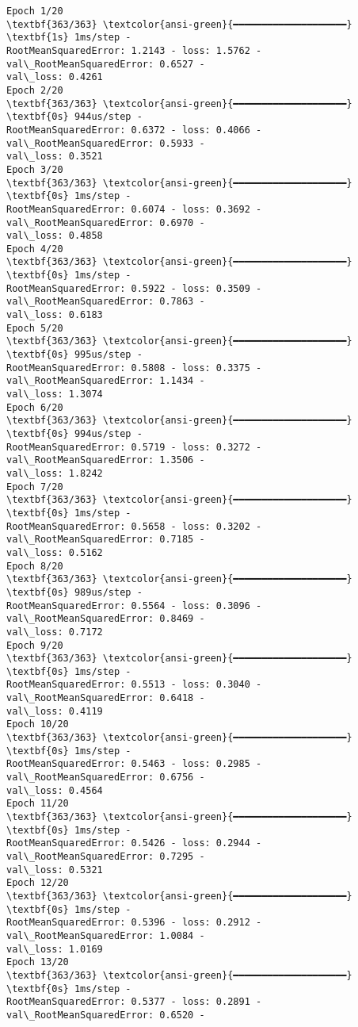 \documentclass[12pt letter]{report}
\begin{document}
    \begin{Verbatim}[commandchars=\\\{\}]
Epoch 1/20
\textbf{363/363} \textcolor{ansi-green}{━━━━━━━━━━━━━━━━━━━━} \textbf{1s} 1ms/step -
RootMeanSquaredError: 1.2143 - loss: 1.5762 - val\_RootMeanSquaredError: 0.6527 -
val\_loss: 0.4261
Epoch 2/20
\textbf{363/363} \textcolor{ansi-green}{━━━━━━━━━━━━━━━━━━━━} \textbf{0s} 944us/step -
RootMeanSquaredError: 0.6372 - loss: 0.4066 - val\_RootMeanSquaredError: 0.5933 -
val\_loss: 0.3521
Epoch 3/20
\textbf{363/363} \textcolor{ansi-green}{━━━━━━━━━━━━━━━━━━━━} \textbf{0s} 1ms/step -
RootMeanSquaredError: 0.6074 - loss: 0.3692 - val\_RootMeanSquaredError: 0.6970 -
val\_loss: 0.4858
Epoch 4/20
\textbf{363/363} \textcolor{ansi-green}{━━━━━━━━━━━━━━━━━━━━} \textbf{0s} 1ms/step -
RootMeanSquaredError: 0.5922 - loss: 0.3509 - val\_RootMeanSquaredError: 0.7863 -
val\_loss: 0.6183
Epoch 5/20
\textbf{363/363} \textcolor{ansi-green}{━━━━━━━━━━━━━━━━━━━━} \textbf{0s} 995us/step -
RootMeanSquaredError: 0.5808 - loss: 0.3375 - val\_RootMeanSquaredError: 1.1434 -
val\_loss: 1.3074
Epoch 6/20
\textbf{363/363} \textcolor{ansi-green}{━━━━━━━━━━━━━━━━━━━━} \textbf{0s} 994us/step -
RootMeanSquaredError: 0.5719 - loss: 0.3272 - val\_RootMeanSquaredError: 1.3506 -
val\_loss: 1.8242
Epoch 7/20
\textbf{363/363} \textcolor{ansi-green}{━━━━━━━━━━━━━━━━━━━━} \textbf{0s} 1ms/step -
RootMeanSquaredError: 0.5658 - loss: 0.3202 - val\_RootMeanSquaredError: 0.7185 -
val\_loss: 0.5162
Epoch 8/20
\textbf{363/363} \textcolor{ansi-green}{━━━━━━━━━━━━━━━━━━━━} \textbf{0s} 989us/step -
RootMeanSquaredError: 0.5564 - loss: 0.3096 - val\_RootMeanSquaredError: 0.8469 -
val\_loss: 0.7172
Epoch 9/20
\textbf{363/363} \textcolor{ansi-green}{━━━━━━━━━━━━━━━━━━━━} \textbf{0s} 1ms/step -
RootMeanSquaredError: 0.5513 - loss: 0.3040 - val\_RootMeanSquaredError: 0.6418 -
val\_loss: 0.4119
Epoch 10/20
\textbf{363/363} \textcolor{ansi-green}{━━━━━━━━━━━━━━━━━━━━} \textbf{0s} 1ms/step -
RootMeanSquaredError: 0.5463 - loss: 0.2985 - val\_RootMeanSquaredError: 0.6756 -
val\_loss: 0.4564
Epoch 11/20
\textbf{363/363} \textcolor{ansi-green}{━━━━━━━━━━━━━━━━━━━━} \textbf{0s} 1ms/step -
RootMeanSquaredError: 0.5426 - loss: 0.2944 - val\_RootMeanSquaredError: 0.7295 -
val\_loss: 0.5321
Epoch 12/20
\textbf{363/363} \textcolor{ansi-green}{━━━━━━━━━━━━━━━━━━━━} \textbf{0s} 1ms/step -
RootMeanSquaredError: 0.5396 - loss: 0.2912 - val\_RootMeanSquaredError: 1.0084 -
val\_loss: 1.0169
Epoch 13/20
\textbf{363/363} \textcolor{ansi-green}{━━━━━━━━━━━━━━━━━━━━} \textbf{0s} 1ms/step -
RootMeanSquaredError: 0.5377 - loss: 0.2891 - val\_RootMeanSquaredError: 0.6520 -

\end{Verbatim}
\end{document}
